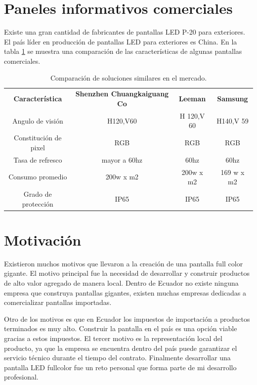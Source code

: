 \section{Paneles informativos comerciales}
Existe una gran cantidad de fabricantes de pantallas LED P-20 para exteriores. El país líder en producción de pantallas LED para exteriores es China. En la tabla \ref{tab:comercial} se muestra una comparación de las características de algunas pantallas comerciales.



\begin{table}[]
\caption[Pantallas comerciales]{Comparación de soluciones similares en el mercado.}
\begin{tabular}{|c|c|c|c|}
\textbf{Característica} & \textbf{Shenzhen Chuangkaiguang Co \citep{TABLAREF1}} & \textbf{Leeman \citep{TABLAREF2}} & \textbf{Samsung \citep{TABLAREF3}} \\
Angulo de visión        & H120,V60                             & H 120,V 60      & H140,V 59        \\
Constitución de pixel   & RGB                                  & RGB             & RGB              \\
Tasa de refresco        & mayor a 60hz                         & 60hz            & 60hz             \\
Consumo promedio        & 200w x m2                            & 200w x m2       & 169 w x m2       \\
Grado de protección     & IP65                                 & IP65            & IP65            
\end{tabular}
\label{tab:comercial}
\end{table}


\section{Motivación}
Existieron muchos motivos que llevaron a la creación de una pantalla full color gigante. El motivo principal fue la necesidad de desarrollar y construir productos de alto valor agregado de manera local. Dentro de Ecuador no existe ninguna empresa que construya pantallas gigantes, existen muchas empresas dedicadas a comercializar pantallas importadas. 

Otro de los motivos es que en Ecuador los impuestos de importación a productos terminados es muy alto. Construir la pantalla en el país es una opción viable gracias a estos impuestos. El tercer motivo es la representación local del producto, ya que la empresa se encuentra dentro del país puede garantizar el servicio técnico durante el tiempo del contrato. Finalmente desarrollar una pantalla LED fullcolor fue un reto personal que forma parte de mi desarrollo profesional. 



